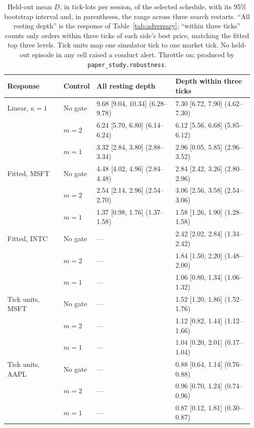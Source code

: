 \documentclass{article}
\begin{document}
\begin{table}[t]
\centering
\footnotesize
\setlength{\tabcolsep}{3pt}
\begin{tabular}{llll}
\toprule
\textbf{Response} & \textbf{Control} & \textbf{All resting depth} & \textbf{Depth within three ticks} \\
\midrule
Linear, $\kappa = 1$ & No gate & 9.68 [9.04, 10.34] (6.28--9.78) & 7.30 [6.72, 7.90] (4.62--7.30) \\
 & $m = 2$ & 6.24 [5.70, 6.80] (6.14--6.24) & 6.12 [5.56, 6.68] (5.85--6.12) \\
 & $m = 1$ & 3.32 [2.84, 3.80] (2.88--3.34) & 2.96 [0.05, 5.85] (2.96--3.52) \\
\addlinespace
Fitted, MSFT & No gate & 4.48 [4.02, 4.96] (2.84--4.48) & 2.84 [2.42, 3.26] (2.80--2.96) \\
 & $m = 2$ & 2.54 [2.14, 2.96] (2.54--2.70) & 3.06 [2.56, 3.58] (2.54--3.06) \\
 & $m = 1$ & 1.37 [0.98, 1.76] (1.37--1.58) & 1.58 [1.26, 1.90] (1.28--1.58) \\
\addlinespace
Fitted, INTC & No gate & --- & 2.42 [2.02, 2.84] (1.34--2.42) \\
 & $m = 2$ & --- & 1.84 [1.50, 2.20] (1.48--2.00) \\
 & $m = 1$ & --- & 1.06 [0.80, 1.34] (1.06--1.32) \\
\addlinespace
Tick units, MSFT & No gate & --- & 1.52 [1.20, 1.86] (1.52--1.76) \\
 & $m = 2$ & --- & 1.12 [0.82, 1.44] (1.12--1.66) \\
 & $m = 1$ & --- & 1.04 [0.20, 2.01] (0.17--1.04) \\
\addlinespace
Tick units, AAPL & No gate & --- & 0.88 [0.64, 1.14] (0.76--0.88) \\
 & $m = 2$ & --- & 0.96 [0.70, 1.24] (0.74--0.96) \\
 & $m = 1$ & --- & 0.87 [0.12, 1.81] (0.30--0.87) \\
\bottomrule
\end{tabular}
\caption{Held-out mean $D$, in tick-lots per session, of the selected schedule, with its 95\% bootstrap interval and, in parentheses, the range across three search restarts. ``All resting depth'' is the response of Table~\ref{tab:adversary}; ``within three ticks'' counts only orders within three ticks of each side's best price, matching the fitted top three levels. Tick units map one simulator tick to one market tick. No held-out episode in any cell raised a conduct alert. Throttle on; produced by \texttt{paper\_study.robustness}.}
\label{tab:robustness}
\end{table}
\end{document}
